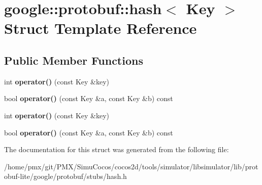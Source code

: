 \hypertarget{structgoogle_1_1protobuf_1_1hash}{}\section{google\+:\+:protobuf\+:\+:hash$<$ Key $>$ Struct Template Reference}
\label{structgoogle_1_1protobuf_1_1hash}
\subsection*{Public Member Functions}
\begin{DoxyCompactItemize}
\item 
\mbox{\label{structgoogle_1_1protobuf_1_1hash_ab9c6b7d7d03cad0664a45b5c64a9c117}} 
int {\bfseries operator()} (const Key \&key)
\item 
\mbox{\label{structgoogle_1_1protobuf_1_1hash_a7128f3248f8f1e92f2221f7e3cf6ec2e}} 
bool {\bfseries operator()} (const Key \&a, const Key \&b) const
\item 
\mbox{\label{structgoogle_1_1protobuf_1_1hash_ab9c6b7d7d03cad0664a45b5c64a9c117}} 
int {\bfseries operator()} (const Key \&key)
\item 
\mbox{\label{structgoogle_1_1protobuf_1_1hash_a7128f3248f8f1e92f2221f7e3cf6ec2e}} 
bool {\bfseries operator()} (const Key \&a, const Key \&b) const
\end{DoxyCompactItemize}


The documentation for this struct was generated from the following file\+:\begin{DoxyCompactItemize}
\item 
/home/pmx/git/\+P\+M\+X/\+Simu\+Cocos/cocos2d/tools/simulator/libsimulator/lib/protobuf-\/lite/google/protobuf/stubs/hash.\+h\end{DoxyCompactItemize}
